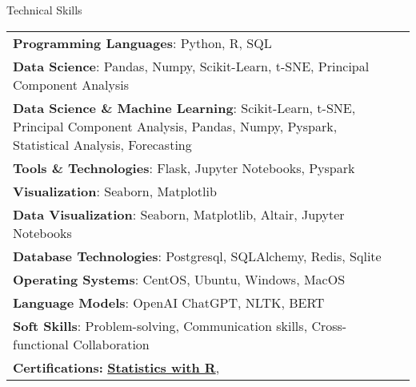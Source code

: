 \documentclass{resume} %
\begin{document}
    \begin{rSection}{Technical Skills}
        \begin{tabular}{ @{} l @{\hspace{1ex}} l }
                                \textbf{Programming Languages}: Python, R, SQL\\
                                \textbf{Data Science}: Pandas, Numpy, Scikit{-}Learn, t{-}SNE, Principal Component Analysis\\
                                \textbf{Data Science \& Machine Learning}: Scikit{-}Learn, t{-}SNE, Principal Component Analysis, Pandas, Numpy, Pyspark, Statistical Analysis, Forecasting\\
                                \textbf{Tools \& Technologies}: Flask, Jupyter Notebooks, Pyspark\\
                                \textbf{Visualization}: Seaborn, Matplotlib\\
                                \textbf{Data Visualization}: Seaborn, Matplotlib, Altair, Jupyter Notebooks\\
                                \textbf{Database Technologies}: Postgresql, SQLAlchemy, Redis, Sqlite\\
                                \textbf{Operating Systems}: CentOS, Ubuntu, Windows, MacOS\\
                                \textbf{Language Models}: OpenAI ChatGPT, NLTK, BERT\\
                                \textbf{Soft Skills}: Problem{-}solving, Communication skills, Cross{-}functional Collaboration\\
                        \textbf{Certifications:} 
                                            \href{}{\textbf{Statistics with R}},\\
                                 
        \end{tabular}
    \end{rSection}
\end{document}
